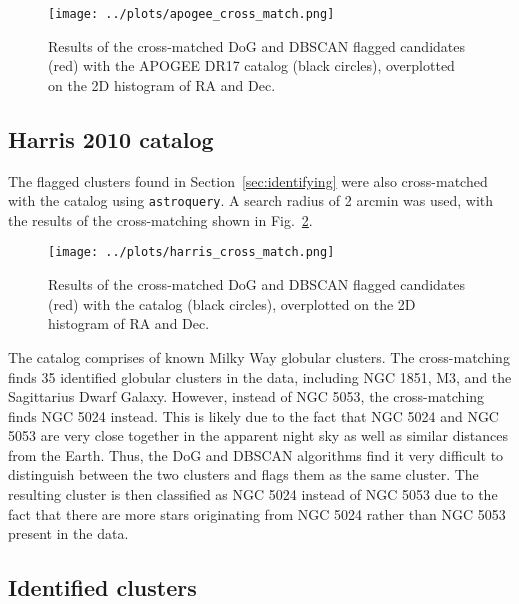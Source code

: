 \documentclass[11pt,a4paper]{article}
\begin{document}
\begin{figure}
    \centering
    \texttt{[image: ../plots/apogee\_cross\_match.png]}
    \caption{Results of the cross-matched DoG and DBSCAN flagged candidates (red) with the APOGEE DR17 catalog (black circles), overplotted on the 2D histogram of RA and Dec.}
    \label{fig:apogee_match}

\end{figure}

\subsection{Harris 2010 catalog}
\label{sec:harris}
The flagged clusters found in Section~\ref{sec:identifying} were also cross-matched with the \citeauthor{harris2010newcatalogglobularclusters} catalog using \texttt{astroquery}. A search radius of 2 arcmin was used, with the results of the cross-matching shown in Fig.~\ref{fig:harris_match}.

\begin{figure}
    \centering
    \texttt{[image: ../plots/harris\_cross\_match.png]}
    \caption{Results of the cross-matched DoG and DBSCAN flagged candidates (red) with the \citeauthor{harris2010newcatalogglobularclusters} catalog (black circles), overplotted on the 2D histogram of RA and Dec.}
    \label{fig:harris_match}
\end{figure}

The \citeauthor{harris2010newcatalogglobularclusters} catalog comprises of known Milky Way globular clusters. The cross-matching finds 35 identified globular clusters in the data, including NGC 1851, M3, and the Sagittarius Dwarf Galaxy. However, instead of NGC 5053, the cross-matching finds NGC 5024 instead. This is likely due to the fact that NGC 5024 and NGC 5053 are very close together in the apparent night sky as well as similar distances from the Earth. Thus, the DoG and DBSCAN algorithms find it very difficult to distinguish between the two clusters and flags them as the same cluster. The resulting cluster is then classified as NGC 5024 instead of NGC 5053 due to the fact that there are more stars originating from NGC 5024 rather than NGC 5053 present in the data.

\subsection{Identified clusters}
\end{document}
